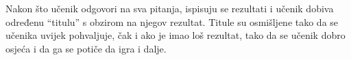 \documentclass{scrreprt}
\begin{document}
Nakon što učenik odgovori na sva pitanja, ispisuju se rezultati i učenik dobiva
određenu ``titulu'' s obzirom na njegov rezultat. Titule su osmišljene tako da
se učenika uvijek pohvaljuje, čak i ako je imao loš rezultat, tako da se učenik
dobro osjeća i da ga se potiče da igra i dalje.



\end{document}
